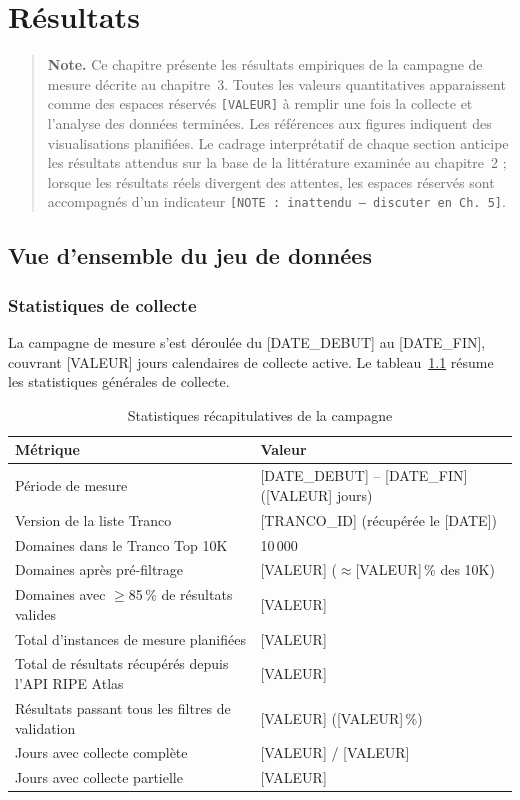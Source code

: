
\chapter{Résultats}

\begin{quote}
\textbf{Note.} Ce chapitre présente les résultats empiriques de la campagne de mesure décrite au chapitre~3. Toutes les valeurs quantitatives apparaissent comme des espaces réservés \texttt{[VALEUR]} à remplir une fois la collecte et l'analyse des données terminées. Les références aux figures indiquent des visualisations planifiées. Le cadrage interprétatif de chaque section anticipe les résultats attendus sur la base de la littérature examinée au chapitre~2 ; lorsque les résultats réels divergent des attentes, les espaces réservés sont accompagnés d'un indicateur \texttt{[NOTE : inattendu --- discuter en Ch.~5]}.
\end{quote}
\bigskip
\section{Vue d'ensemble du jeu de données}
\label{sec:4.1}

\subsection{Statistiques de collecte}
\label{subsec:4.1.1}

La campagne de mesure s'est déroulée du [DATE\_DEBUT] au [DATE\_FIN], couvrant [VALEUR] jours calendaires de collecte active. Le tableau~\ref{tab:campaign_summary} résume les statistiques générales de collecte.

\begin{table}[H]
\centering
\small
\begin{tabularx}{\linewidth}{l X}
\toprule
\textbf{Métrique} & \textbf{Valeur} \\
\midrule
Période de mesure & [DATE\_DEBUT] -- [DATE\_FIN] ([VALEUR] jours) \\
Version de la liste Tranco & [TRANCO\_ID] (récupérée le [DATE]) \\
Domaines dans le Tranco Top 10K & 10\,000 \\
Domaines après pré-filtrage & [VALEUR] ($\approx$[VALEUR]\,\% des 10K) \\
Domaines avec $\geq$85\,\% de résultats valides & [VALEUR] \\
Total d'instances de mesure planifiées & [VALEUR] \\
Total de résultats récupérés depuis l'API RIPE Atlas & [VALEUR] \\
Résultats passant tous les filtres de validation & [VALEUR] ([VALEUR]\,\%) \\
Jours avec collecte complète & [VALEUR] / [VALEUR] \\
Jours avec collecte partielle & [VALEUR] \\
\bottomrule
\end{tabularx}
\caption{Statistiques récapitulatives de la campagne}
\label{tab:campaign_summary}
\end{table}

